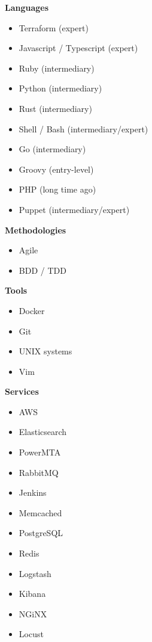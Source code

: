 \documentclass[9pt]{template} %
\begin{document}
\begin{minipage}[t]{0.3\textwidth} %
  \vspace{-\baselineskip}

  \textbf{Languages}
  \begin{itemize}
      \item Terraform {\footnotesize (expert)}
      \item Javascript / Typescript {\footnotesize (expert)}
      \item Ruby {\footnotesize (intermediary)}
      \item Python {\footnotesize (intermediary)}
      \item Rust {\footnotesize (intermediary)}
      \item Shell / Bash {\footnotesize (intermediary/expert)}
      \item Go {\footnotesize (intermediary)}
      \item Groovy {\footnotesize (entry-level)}
      \item PHP {\footnotesize (long time ago)}
      \item Puppet {\footnotesize (intermediary/expert)}
  \end{itemize}
\end{minipage}
\hfill
\begin{minipage}[t]{0.3\textwidth}
  \vspace{-\baselineskip}

  \textbf{Methodologies}
  \begin{itemize}
      \item Agile
      \item BDD / TDD
  \end{itemize}

  \textbf{Tools}
  \begin{itemize}
      \item Docker
      \item Git
      \item UNIX systems
      \item Vim
  \end{itemize}
\end{minipage}
\hfill
\begin{minipage}[t]{0.3\textwidth}
  \vspace{-\baselineskip}

  \textbf{Services}
  \begin{itemize}
      \item AWS
      \item Elasticsearch
      \item PowerMTA
      \item RabbitMQ
      \item Jenkins
      \item Memcached
      \item PostgreSQL
      \item Redis
      \item Logstash
      \item Kibana
      \item NGiNX
      \item Locust
  \end{itemize}
\end{minipage}

\end{document}
